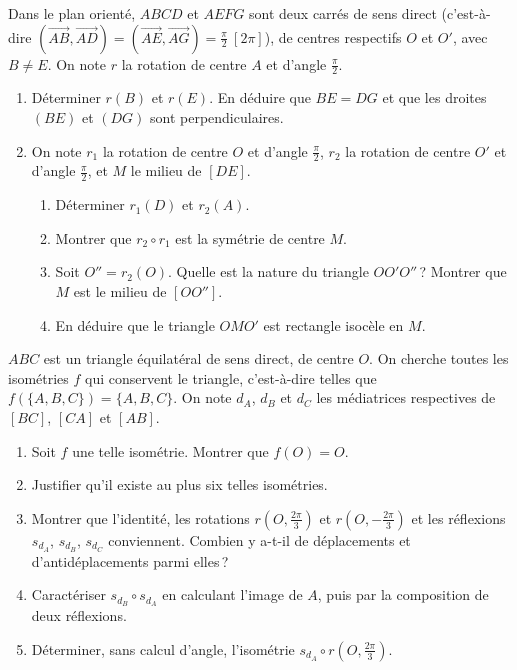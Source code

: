 \begin{exo}\label{exo:isom-deux-carres}
      Dans le plan orienté, $ABCD$ et $AEFG$ sont deux carrés de sens direct
      (c'est-à-dire $(\overrightarrow{AB},\overrightarrow{AD}) = (\overrightarrow{AE},\overrightarrow{AG}) = \frac{\pi}{2}\ [2\pi]$),
      de centres respectifs $O$ et $O'$, avec $B \neq E$.
      On note $r$ la rotation de centre $A$ et d'angle $\frac{\pi}{2}$.
      \begin{enumerate}
            \item Déterminer $r(B)$ et $r(E)$. En déduire que $BE = DG$ et que les droites $(BE)$ et $(DG)$ sont perpendiculaires.
            \item On note $r_1$ la rotation de centre $O$ et d'angle $\frac{\pi}{2}$, $r_2$ la rotation de centre $O'$ et d'angle $\frac{\pi}{2}$,
                  et $M$ le milieu de $[DE]$.
                  \begin{enumerate}
                        \item Déterminer $r_1(D)$ et $r_2(A)$.
                        \item Montrer que $r_2 \circ r_1$ est la symétrie de centre $M$.
                        \item Soit $O'' = r_2(O)$. Quelle est la nature du triangle $OO'O''$\,?
                              Montrer que $M$ est le milieu de $[OO'']$.
                        \item En déduire que le triangle $OMO'$ est rectangle isocèle en $M$.
                  \end{enumerate}
      \end{enumerate}
\end{exo}
\begin{exo}\label{exo:isom-triangle-invariant}
      $ABC$ est un triangle équilatéral de sens direct, de centre $O$.
      On cherche toutes les isométries $f$ qui conservent le triangle, c'est-à-dire telles que
      $f(\{A,B,C\}) = \{A,B,C\}$.
      On note $d_A$, $d_B$ et $d_C$ les médiatrices respectives de $[BC]$, $[CA]$ et $[AB]$.
      \begin{enumerate}
            \item Soit $f$ une telle isométrie. Montrer que $f(O) = O$.
            \item Justifier qu'il existe au plus six telles isométries.
            \item Montrer que l'identité, les rotations $r(O,\frac{2\pi}{3})$ et $r(O,-\frac{2\pi}{3})$ et les réflexions
                  $s_{d_A}$, $s_{d_B}$, $s_{d_C}$ conviennent. Combien y a-t-il de déplacements et d'antidéplacements parmi elles\,?
            \item Caractériser $s_{d_B} \circ s_{d_A}$ en calculant l'image de $A$, puis par la composition de deux réflexions.
            \item Déterminer, sans calcul d'angle, l'isométrie $s_{d_A} \circ r(O,\frac{2\pi}{3})$.
      \end{enumerate}
\end{exo}
